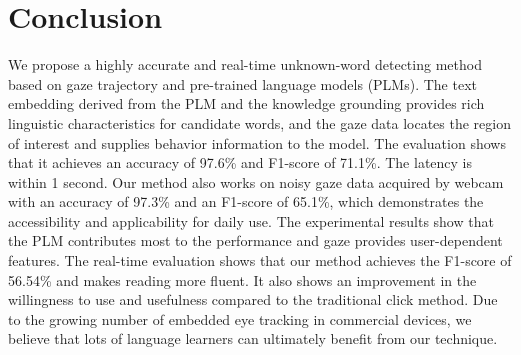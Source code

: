 \section{Conclusion}
We propose a highly accurate and real-time unknown-word detecting method based on gaze trajectory and pre-trained language models (PLMs). The text embedding derived from the PLM and the knowledge grounding provides rich linguistic characteristics for candidate words, and the gaze data locates the region of interest and supplies behavior information to the model. The evaluation shows that it achieves an accuracy of 97.6\% and F1-score of 71.1\%. The latency is within 1 second. Our method also works on noisy gaze data acquired by webcam with an accuracy of 97.3\% and an F1-score of 65.1\%, which demonstrates the accessibility and applicability for daily use. The experimental results show that the PLM contributes most to the performance and gaze provides user-dependent features. The real-time evaluation shows that our method achieves the F1-score of 56.54\% and makes reading more fluent. It also shows an improvement in the willingness to use and usefulness compared to the traditional click method. Due to the growing number of embedded eye tracking in commercial devices, we believe that lots of language learners can ultimately benefit from our technique.